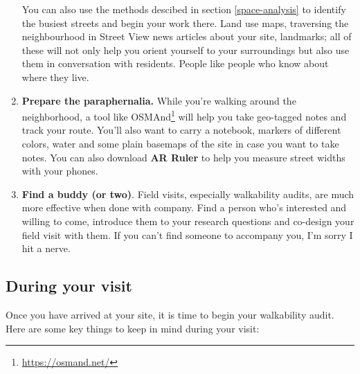 \documentclass[
]{latex/krantz}
\renewcommand{\href}[2]{#2\footnote{\url{#1}}}
\DeclareRobustCommand{\href}[2]{#2\footnote{\url{#1}}}
\begin{document}
\begin{enumerate}
  You can also use the methods descibed in section \ref{space-analysis} to identify the busiest streets and begin your work there. Land use maps, traversing the neighbourhood in Street View news articles about your site, landmarks; all of these will not only help you orient yourself to your surroundings but also use them in conversation with residents. People like people who know about where they live.
\item
  \textbf{Prepare the paraphernalia.} While you're walking around the neighborhood, a tool like \href{https://osmand.net/}{OSMAnd} will help you take geo-tagged notes and track your route. You'll also want to carry a notebook, markers of different colors, water and some plain basemaps of the site in case you want to take notes. You can also download \textbf{AR Ruler} to help you measure street widths with your phones.
\item
  \textbf{Find a buddy (or two)}. Field visits, especially walkability audits, are much more effective when done with company. Find a person who's interested and willing to come, introduce them to your research questions and co-design your field visit with them. If you can't find someone to accompany you, I'm sorry I hit a nerve.
\end{enumerate}

\hypertarget{during}{%
\subsection{During your visit}\label{during}}

Once you have arrived at your site, it is time to begin your walkability audit. Here are some key things to keep in mind during your visit:
\end{document}
